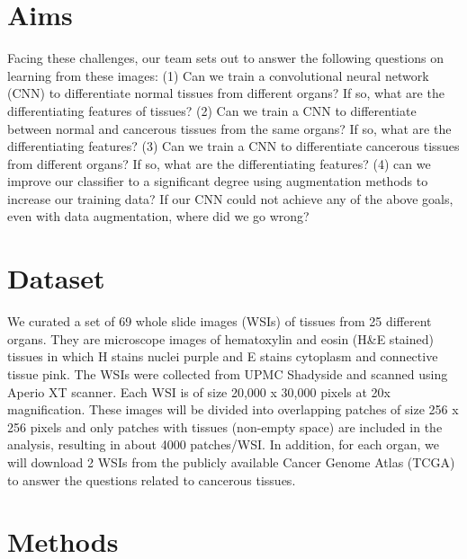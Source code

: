 \documentclass[10pt,twocolumn,letterpaper]{article}
\begin{document}
\section{Aims}
\label{sec:Aims}

Facing these challenges, our team sets out to answer the following questions on learning from these images: (1) Can we train a convolutional neural network (CNN) to differentiate normal tissues from different organs? If so, what are the differentiating features of tissues? (2) Can we train a CNN to differentiate between normal and cancerous tissues from the same organs? If so, what are the differentiating features? (3) Can we train a CNN to differentiate cancerous tissues from different organs? If so, what are the differentiating features? (4) can we improve our classifier to a significant degree using augmentation methods to increase our training data? If our CNN could not achieve any of the above goals, even with data augmentation, where did we go wrong? 

\section{Dataset}
\label{sec:Dataset}

We curated a set of 69 whole slide images (WSIs) of tissues from 25 different organs. They are microscope images of hematoxylin and eosin (H&E stained) tissues in which H stains nuclei purple and E stains cytoplasm and connective tissue pink. The WSIs were collected from UPMC Shadyside and scanned using Aperio XT scanner. Each WSI is of size 20,000 x 30,000 pixels at 20x magnification. These images will be divided into overlapping patches of size 256 x 256 pixels and only patches with tissues (non-empty space) are included in the analysis, resulting in about 4000 patches/WSI. In addition, for each organ, we will download 2 WSIs from the publicly available Cancer Genome Atlas (TCGA) to answer the questions related to cancerous tissues. 

\section{Methods}
\label{sec:Methods}
\end{document}
